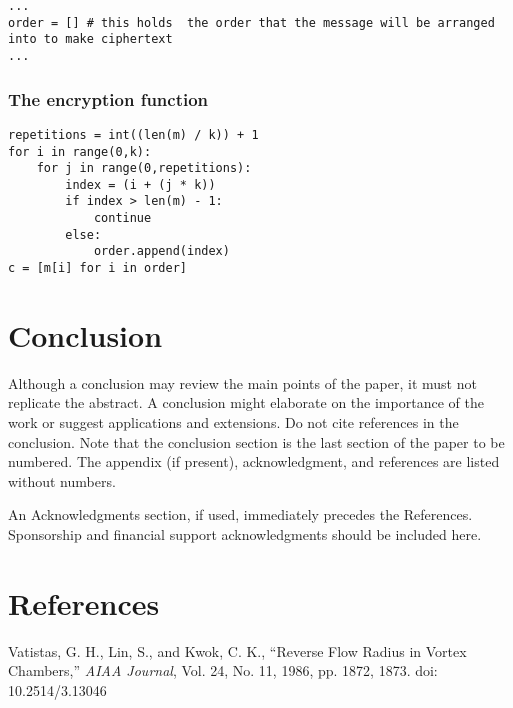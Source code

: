 \documentclass{AIAA}
\begin{document}
\begin{verbatim}
...
order = [] # this holds  the order that the message will be arranged into to make ciphertext
...
\end{verbatim}

\subsubsection{The encryption function}

\begin{verbatim}
repetitions = int((len(m) / k)) + 1
for i in range(0,k):
    for j in range(0,repetitions):
        index = (i + (j * k))
        if index > len(m) - 1:
            continue
        else:
            order.append(index)
c = [m[i] for i in order]
\end{verbatim}

\section{Conclusion}
Although a conclusion may review the main points of the paper, it must not replicate the abstract. A conclusion might elaborate on the importance of the work or suggest applications and extensions. Do not cite references in the conclusion. Note that the conclusion section is the last section of the paper to be numbered. The appendix (if present), acknowledgment, and references are listed without numbers.

An Acknowledgments section, if used, immediately precedes the References. Sponsorship and financial support acknowledgments should be included here.

\section*{References}

\begin{thebibliography}{}
 Vatistas, G. H., Lin, S., and Kwok, C. K., ``Reverse Flow Radius in Vortex Chambers,'' \textit{AIAA Journal}, Vol. 24, No. 11, 1986, pp. 1872, 1873. doi: 10.2514/3.13046

\end{thebibliography}
\end{document}
